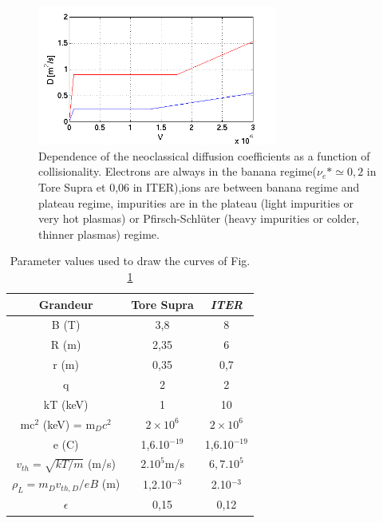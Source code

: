 \begin{figure}[htbp]
	\centering
		\includegraphics[width=0.70\textwidth]{Fig_Regimes_collisionnels.png}
	\caption{Dependence of the neoclassical diffusion coefficients as a function of collisionality. Electrons are always in the banana regime($\nu_e* \simeq 0,2$ in Tore Supra et 0,06 in ITER),ions are between banana regime and plateau regime, impurities are in the plateau (light impurities or very hot plasmas) or Pfirsch-Schlüter (heavy impurities or colder, thinner plasmas) regime.}
	\label{fig:Regimes_collisionnels}
\end{figure}
\begin{table}[htbp]
	\centering
		\begin{tabular}{|c|c|c|}
			\hline
			Grandeur											&		Tore Supra				&		\textit{ITER}	\\
			\hline
			B (T)													&				3,8						&		8							\\
			R	(m)													&				2,35					&		6							\\
			r (m)													&				0,35					&		0,7						\\
			q															&				2							&				2					\\
			kT (keV)											&				1							&				10				\\
			mc$^2$ (keV) =	m$_D c^2$			&	$2\times 10^6$			&	$2\times 10^6$	\\
			e	(C)													&		1,6.10$^{-19}$ 		&	1,6.10$^{-19}$	\\
			\hline
			$v_{th} = \sqrt{kT/m}$ (m/s)	&		$2.10^5$m/s				&	$6,7.10^5$ 			\\
			$\rho_L = m_D v_{th,D} /eB$ (m)	&			1,2.10$^{-3}$		&		2.10$^{-3}$		\\
			$\epsilon$										&				0,15					&			0,12				\\
			\hline
		\end{tabular}
	\caption{Parameter values used to draw the curves of Fig. \ref{fig:Regimes_collisionnels}}
	\label{tab:Regimes_collisionnels}
\end{table}


